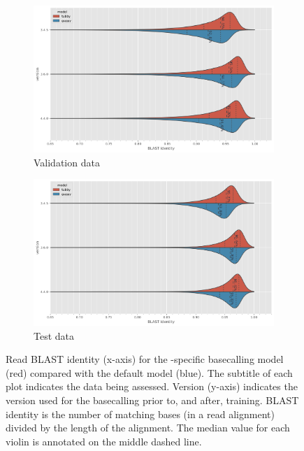 \begin{figure}
     \centering
     \begin{subfigure}[b]{0.9\textwidth}
        \includegraphics[width=1\linewidth]{Chapter4/Figs/read_blast_identity.png}
        \centering
        \caption{Validation data}
        \label{fig:eval-read-blast}
     \end{subfigure}
     \hfill
     \begin{subfigure}[b]{0.9\textwidth}
         \centering
        \includegraphics[width=1\linewidth]{Chapter4/Figs/test_read_blast_identity.png}
         \caption{Test data}
         \label{fig:test-read-blast}
     \end{subfigure}
    \caption{Read BLAST identity (x-axis) for the \mtb{}-specific basecalling model \tubby{} (red) compared with the default \guppy{} model (blue). The subtitle of each plot indicates the data being assessed. Version (y-axis) indicates the \guppy{} version used for the basecalling prior to, and after, training. BLAST identity is the number of matching bases (in a read alignment) divided by the length of the alignment. The median value for each violin is annotated on the middle dashed line.}
        \label{fig:read-blast}
\end{figure}

